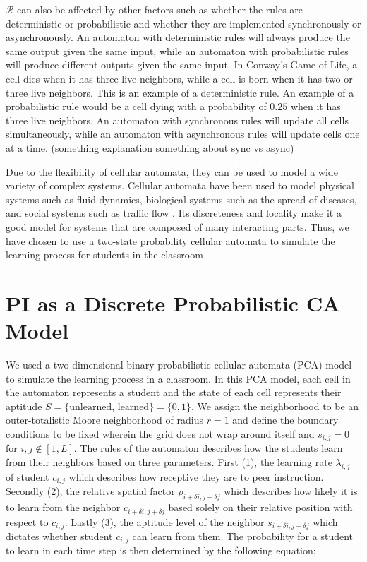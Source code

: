 $\mathcal{R}$ can also be affected by other factors such as whether the rules are deterministic or probabilistic and whether they are implemented synchronously or asynchronously. An automaton with deterministic rules will always produce the same output given the same input, while an automaton with probabilistic rules will produce different outputs given the same input. In Conway's Game of Life, a cell dies when it has three live neighbors, while a cell is born when it has two or three live neighbors. This is an example of a deterministic rule. An example of a probabilistic rule would be a cell dying with a probability of $0.25$ when it has three live neighbors. An automaton with synchronous rules will update all cells simultaneously, while an automaton with asynchronous rules will update cells one at a time. (something explanation something about sync vs async)


Due to the flexibility of cellular automata, they can be used to model a wide variety of complex systems. Cellular automata have been used to model physical systems such as fluid dynamics, biological systems such as the spread of diseases, and social systems such as traffic flow \cite{louis2018probabilistic}. Its discreteness and locality make it a good model for systems that are composed of many interacting parts. Thus, we have chosen to use a two-state probability cellular automata to simulate the learning process for students in the classroom


\section{PI as a Discrete Probabilistic CA Model}

We used a two-dimensional binary probabilistic cellular automata (PCA) model to simulate the learning process in a classroom. In this PCA model, each cell in the automaton represents a student and the state of each cell represents their aptitude $S=\lbrace\text{unlearned, learned}\rbrace=\lbrace 0,1 \rbrace$. We assign the neighborhood to be an outer-totalistic Moore neighborhood of radius $r=1$ and define the boundary conditions to be fixed wherein the grid does not wrap around itself and $s_{i,j} = 0$ for ${i,j \notin [1,L]}$. The rules of the automaton describes how the students learn from their neighbors based on three parameters. First (1), the learning rate $\lambda_{i,j}$ of student $c_{i,j}$ which describes how receptive they are to peer instruction. Secondly (2), the relative spatial factor $\rho_{i+\delta i, j+\delta j}$ which describes how likely it is to learn from the neighbor $c_{i+\delta i, j+\delta j}$ based solely on their relative position with respect to $c_{i,j}$. Lastly (3), the aptitude level of the neighbor $s_{i+\delta i, j+\delta j}$ which dictates whether student $c_{i,j}$ can learn from them. The probability for a student to learn in each time step is then determined by the following equation:

